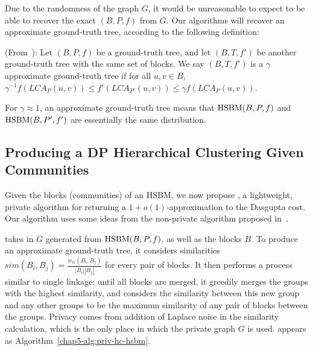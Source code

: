 Due to the randomness of the graph $G$, it would be unreasonable to expect to be able to recover the exact $(B,P,f)$ from $G$. Our algorithms will recover an approximate ground-truth tree, according to the following definition:

\begin{defn} (From~\citet{cohen2017hierarchical}):
Let $(B,P,f)$ be a ground-truth tree, and let $(B,T,f')$ be another ground-truth tree with the same set of blocks. We say $(B,T, f')$ is a $\gamma$ approximate ground-truth tree if for all $u, v \in B$, $
\gamma^{-1} f(LCA_P(u,v)) \leq f'(LCA_{P'}(u,v)) \leq \gamma f(LCA_P(u,v))$.
\end{defn}
For $\gamma \approx 1$, an approximate ground-truth tree means that $\textnormal{HSBM}(B,P,f)$ and $\textnormal{HSBM}(B,P',f')$ are essentially the same distribution.

\subsection{Producing a DP Hierarchical Clustering Given Communities}\label{chap5-sec:priv-hc-hsbm}

Given the blocks (communities) of an HSBM, we now propose \dphcblocks{}, a lightweight, private algorithm for returning a $1+o(1)$-approximation to the Dasgupta cost. Our algorithm uses some ideas from the non-private algorithm proposed in~\citet{cohen2017hierarchical,cohen2019hierarchical}.

\dphcblocks{} takes in $G$ generated from $\textnormal{HSBM}(B,P,f)$, as well as the blocks $B$. 
To produce an approximate ground-truth tree, it considers similarities $sim(B_i, B_j) = \frac{w_G(B_i, B_j)}{|B_i||B_j|}$ for every pair of blocks. It then performs a process similar to single linkage: until all blocks are merged, it greedily merges the groups with the highest similarity, and considers the similarity between this new group and any other groups to be the maximum similarity of any pair of blocks between the groups. Privacy comes from addition of Laplace noise in the similarity calculation, which is the only place in which the private graph $G$ is used. \dphcblocks{} appears as Algorithm~\ref{chap5-alg:priv-hc-hsbm}.

